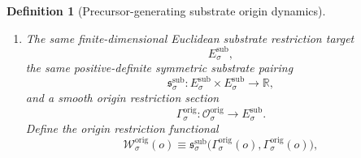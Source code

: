 \documentclass[11pt]{article}
\newcommand{\SubBody}[1]{\mathcal B_{#1}^{\mathrm{sub}}}
\newcommand{\SubTarget}[1]{E_{#1}^{\mathrm{sub}}}
\newcommand{\SubPair}[1]{\mathfrak s_{#1}^{\mathrm{sub}}}
\newcommand{\LiftBody}[1]{\mathcal B_{#1}^{\mathrm{lift}}}
\newcommand{\LiftProj}[1]{\Pi_{#1}^{\mathrm{lift}}}
\newcommand{\LiftSelect}[1]{\mathfrak s_{#1}^{\mathrm{lift}}}
\newcommand{\PrecBody}[1]{\mathcal B_{#1}^{\mathrm{prec}}}
\newcommand{\PrecProj}[1]{\Pi_{#1}^{\mathrm{prec}}}
\newcommand{\PrecLiftMin}[1]{\mathfrak f_{#1}^{\mathrm{prec}}}
\newcommand{\PrecSubMin}[1]{\mathfrak m_{#1}^{\mathrm{prec}}}
\newcommand{\OrigSpace}[1]{\mathcal O_{#1}^{\mathrm{orig}}}
\newcommand{\OrigBody}[1]{\mathcal B_{#1}^{\mathrm{orig}}}
\newcommand{\OrigProj}[1]{\Pi_{#1}^{\mathrm{orig}}}
\newcommand{\OrigPrecMin}[1]{\mathfrak f_{#1}^{\mathrm{orig,prec}}}
\newcommand{\OrigLiftMin}[1]{\mathfrak f_{#1}^{\mathrm{orig,lift}}}
\newcommand{\OrigSubMin}[1]{\mathfrak m_{#1}^{\mathrm{orig}}}
\newcommand{\OrigSection}[1]{\Gamma_{#1}^{\mathrm{orig}}}
\newcommand{\OrigFunctional}[1]{\mathscr W_{#1}^{\mathrm{orig}}}
\newtheorem{definition}{Definition}
\begin{document}
\begin{definition}[Precursor-generating substrate origin dynamics]
\begin{enumerate}
    There is a smooth origin precursor-fiber minimizer
    \[
    \OrigPrecMin{\sigma}:\PrecBody{\sigma}\to\OrigBody{\sigma}
    \]
    satisfying
    \[
    \OrigProj{\sigma}\circ\OrigPrecMin{\sigma}
    =
    \mathrm{id}_{\PrecBody{\sigma}},
    \]
    a smooth origin lift-fiber minimizer
    \[
    \OrigLiftMin{\sigma}:\LiftBody{\sigma}\to\OrigBody{\sigma}
    \]
    satisfying
    \[
    \PrecProj{\sigma}\circ\OrigProj{\sigma}\circ\OrigLiftMin{\sigma}
    =
    \mathrm{id}_{\LiftBody{\sigma}},
    \]
    and a smooth origin substrate-fiber minimizer
    \[
    \OrigSubMin{\sigma}:\SubBody{\sigma}\to\OrigBody{\sigma}
    \]
    satisfying
    \[
    \LiftProj{\sigma}\circ\PrecProj{\sigma}\circ\OrigProj{\sigma}\circ\OrigSubMin{\sigma}
    =
    \mathrm{id}_{\SubBody{\sigma}}.
    \]
    Define
    \begin{equation}
    \PrecLiftMin{\sigma}
    \equiv
    \OrigProj{\sigma}\circ\OrigLiftMin{\sigma},
    \qquad
    \PrecSubMin{\sigma}
    \equiv
    \OrigProj{\sigma}\circ\OrigSubMin{\sigma},
    \qquad
    \LiftSelect{\sigma}
    \equiv
    \PrecProj{\sigma}\circ\PrecSubMin{\sigma}.
    \label{eq:originducedmin}
    \end{equation}
    Assume
    \begin{equation}
    \OrigPrecMin{\sigma}\bigl(\PrecLiftMin{\sigma}(\ell)\bigr)
    =
    \OrigLiftMin{\sigma}(\ell)
    \qquad
    \text{for every }\ell\in\LiftBody{\sigma},
    \label{eq:origcompatpreclift}
    \end{equation}
    and
    \begin{equation}
    \OrigLiftMin{\sigma}\bigl(\LiftSelect{\sigma}(m)\bigr)
    =
    \OrigSubMin{\sigma}(m)
    \qquad
    \text{for every }m\in\SubBody{\sigma}.
    \label{eq:origcompatliftsub}
    \end{equation}
    \item The same finite-dimensional Euclidean substrate restriction target
    \[
    \SubTarget{\sigma},
    \]
    the same positive-definite symmetric substrate pairing
    \[
    \SubPair{\sigma}:
    \SubTarget{\sigma}\times\SubTarget{\sigma}\to\mathbb R,
    \]
    and a smooth origin restriction section
    \[
    \OrigSection{\sigma}:\OrigSpace{\sigma}\to\SubTarget{\sigma}.
    \]
    Define the origin restriction functional
    \begin{equation}
    \OrigFunctional{\sigma}(o)
    \equiv
    \SubPair{\sigma}\bigl(\OrigSection{\sigma}(o),\OrigSection{\sigma}(o)\bigr),
    \label{eq:origfunctional}
    \end{equation}

\end{enumerate}
\end{definition}
\end{document}

